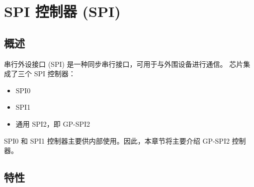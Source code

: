 \documentclass[main\_\_CN.tex]{subfiles}
\begin{document}

\ifglobal
\else
    {\let\clearpage\relax \listoftodos}
    \tableofcontents
\fi

\hypertarget{spi}{}
\chapter{SPI 控制器 (SPI)}
\label{mod:spi}


\section{概述}

串行外设接口 (SPI) 是一种同步串行接口，可用于与外围设备进行通信。
\chipname{} 芯片集成了三个 SPI 控制器：
\begin{itemize}
  \item SPI0
  \item SPI1
  \item 通用 SPI2，即 GP-SPI2
\end{itemize}
SPI0 和 SPI1 控制器主要供内部使用。因此，本章节将主要介绍 GP-SPI2 控制器。



\vspace{-2em}
\section{特性}
\end{document}
